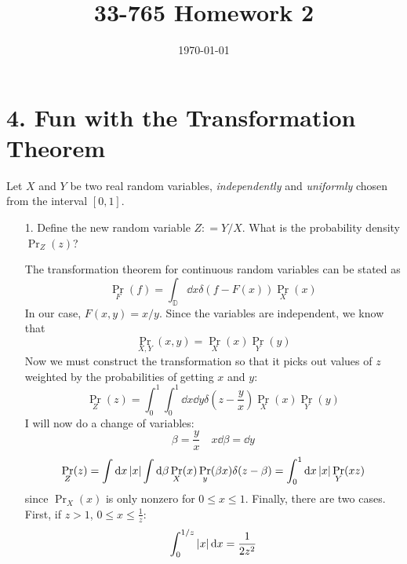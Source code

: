 \documentclass[a4paper,twoside]{article}
\title{33-765 Homework 2}
\date{\today}
\begin{document}
\maketitle
\section*{4. Fun with the Transformation Theorem}
Let $ X $ and $ Y $ be two real random variables, \textit{independently} and \textit{uniformly} chosen from the interval $ [0,1] $.
\begin{itemize}
    \item[1.] Define the new random variable $ Z \colon = Y/X $. What is the probability density $ \Pr_{Z}(z) $?
        \begin{problem}
            The transformation theorem for continuous random variables can be stated as
            \begin{equation}
                \Pr_{F}(f) = \int_{\mathbb{D}} \dd{x} \delta(f - F(x)) \Pr_{X}(x)
            \end{equation}
            In our case, $ F(x, y) = x/y $. Since the variables are independent, we know that
            \begin{equation}
                \Pr_{X,Y}(x,y) = \Pr_{X}(x) \Pr_{Y}(y)
            \end{equation}
            Now we must construct the transformation so that it picks out values of $ z $ weighted by the probabilities of getting $ x $ and $ y $:
            \begin{equation}
                \Pr_{Z}(z) = \int_0^1 \int_0^1 \dd{x} \dd{y} \delta\left( z - \frac{y}{x} \right) \Pr_{X}(x) \Pr_{Y}(y)
            \end{equation}
            I will now do a change of variables:
            \begin{equation}
                \beta = \frac{y}{x}\quad x\dd{\beta} = \dd{y}
            \end{equation}
            \begin{equation}
                \Pr_{Z}(z) = \int \dd{x} \abs{x} \int \dd{\beta} \Pr_{X}(x) \Pr_{y}(\beta x) \delta(z - \beta) = \int_0^1 \dd{x} \abs{x} \Pr_{Y}(xz)
            \end{equation}
            since $ \Pr_{X}(x) $ is only nonzero for $ 0 \leq x \leq 1 $. Finally, there are two cases. First, if $ z > 1 $, $ 0 \leq x \leq \frac{1}{z} $:
            \begin{equation}
                \int_0^{1/z} \abs{x} \dd{x} = \frac{1}{2z^2}
            \end{equation}

\end{problem}
\end{itemize}
\end{document}
